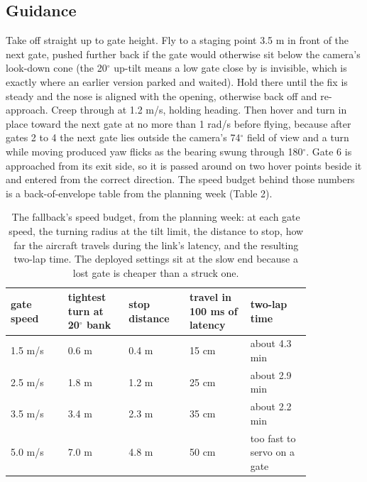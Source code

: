 \documentclass{article}
\begin{document}
\subsection{Guidance}
Take off straight up to gate height. Fly to a staging point 3.5 m in front of the next gate, pushed further back if the gate would otherwise sit below the camera's look-down cone (the 20$^\circ$ up-tilt means a low gate close by is invisible, which is exactly where an earlier version parked and waited). Hold there until the fix is steady and the nose is aligned with the opening, otherwise back off and re-approach. Creep through at 1.2 m/s, holding heading. Then hover and turn in place toward the next gate at no more than 1 rad/s before flying, because after gates 2 to 4 the next gate lies outside the camera's 74$^\circ$ field of view and a turn while moving produced yaw flicks as the bearing swung through 180$^\circ$. Gate 6 is approached from its exit side, so it is passed around on two hover points beside it and entered from the correct direction. The speed budget behind those numbers is a back-of-envelope table from the planning week (Table 2).

\begin{table}[htbp]\centering\small
\begin{tabular}{@{}p{0.16\linewidth}p{0.17\linewidth}p{0.17\linewidth}p{0.17\linewidth}p{0.17\linewidth}@{}}
\toprule
gate speed & tightest turn at 20$^\circ$ bank & stop distance & travel in 100 ms of latency & two-lap time \\ \midrule
1.5 m/s & 0.6 m & 0.4 m & 15 cm & about 4.3 min \\
2.5 m/s & 1.8 m & 1.2 m & 25 cm & about 2.9 min \\
3.5 m/s & 3.4 m & 2.3 m & 35 cm & about 2.2 min \\
5.0 m/s & 7.0 m & 4.8 m & 50 cm & too fast to servo on a gate \\
\bottomrule
\end{tabular}
\caption{The fallback's speed budget, from the planning week: at each gate speed, the turning radius at the tilt limit, the distance to stop, how far the aircraft travels during the link's latency, and the resulting two-lap time. The deployed settings sit at the slow end because a lost gate is cheaper than a struck one.}\end{table}
\end{document}
